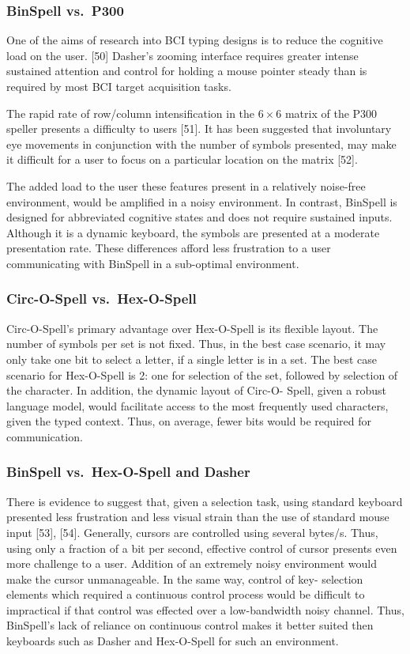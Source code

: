 \documentclass[12pt,titlepage]{article}
\begin{document}
\subsubsection{BinSpell vs.\ P300}

One of the aims of research into BCI typing designs is to reduce the cognitive load on the user.
[50]  Dasher's zooming interface requires greater intense sustained attention and control for 
holding a mouse pointer steady than is required by most BCI target acquisition tasks. 

The rapid rate of row/column intensification in the $6\times6$ matrix of the P300 speller presents a 
difficulty to users [51].  It has been suggested that involuntary eye movements in conjunction with 
the number of symbols presented, may make it difficult for a user to focus on a particular 
location on the matrix [52]. 

The added load to the user these features present in a relatively noise-free environment, would 
be amplified in a noisy environment.  In contrast, BinSpell is designed for abbreviated 
cognitive states and does not require sustained inputs.  Although it is a dynamic keyboard, the 
symbols are presented at a moderate presentation rate.  These differences afford less frustration 
to a user communicating with BinSpell in a sub-optimal environment.

\subsubsection{Circ-O-Spell vs.\ Hex-O-Spell}

Circ-O-Spell's primary advantage over Hex-O-Spell is its flexible layout.  The number of 
symbols per set is not fixed.  Thus, in the best case scenario, it may only take one bit to select a 
letter, if a single letter is in a set.  The best case scenario for Hex-O-Spell is 2: one for selection 
of the set, followed by selection of the character.  In addition, the dynamic layout of Circ-O- 
Spell, given a robust language model, would facilitate access to the most frequently used 
characters, given the typed context.  Thus, on average, fewer bits would be required for 
communication.

\subsubsection{BinSpell vs.\ Hex-O-Spell and Dasher}

There is evidence to suggest that, given a selection task, using standard keyboard  presented 
less frustration and less visual strain than the use of standard mouse input [53], [54].  Generally, 
cursors are controlled using several bytes/s.  Thus, using only a fraction of a bit per second, 
effective control of cursor presents even more challenge to a user.  Addition of an extremely 
noisy environment would make the cursor unmanageable.  In the same way, control of key- 
selection elements which required a continuous control process would be difficult to 
impractical if that control was effected over a low-bandwidth noisy channel.  Thus, BinSpell's 
lack of reliance on continuous control makes it better suited then keyboards such as Dasher and 
Hex-O-Spell for such an environment.
\end{document}
